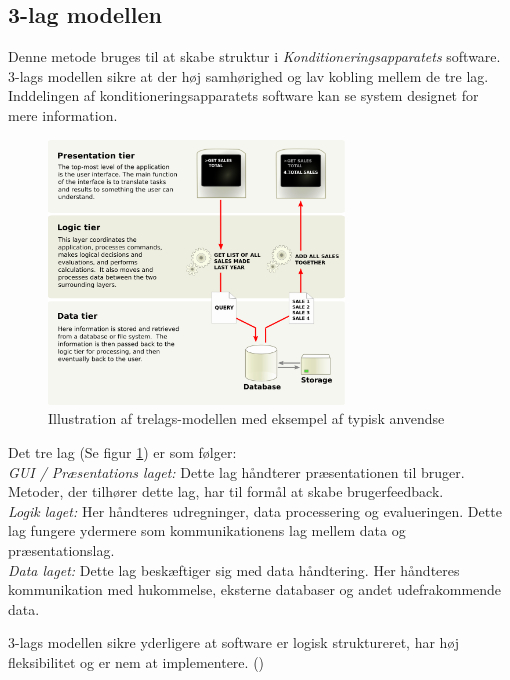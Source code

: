 \subsection{3-lag modellen}
Denne metode bruges til at skabe struktur i \textit{Konditioneringsapparatets} software. 3-lags modellen sikre at der høj samhørighed og lav kobling mellem de tre lag. Inddelingen af konditioneringsapparatets software kan se system designet  for mere information. 
\begin{figure}[H]
	\centering
\includegraphics[width = 0.7\textwidth]{billeder/trelagsmodel.png}
\caption{Illustration af trelags-modellen med eksempel af typisk anvendse}\label{fig:3lagsmodel}
\end{figure}
Det tre lag (Se figur \ref{fig:3lagsmodel}) er som følger: \\
\textit{GUI / Præsentations laget:} Dette lag håndterer præsentationen til bruger. Metoder, der tilhører dette lag, har til formål at skabe brugerfeedback. \\
\textit{Logik laget: } Her håndteres udregninger, data processering og evalueringen. Dette lag fungere ydermere som kommunikationens lag mellem data og præsentationslag. 
\\ \textit{Data laget: } Dette lag beskæftiger sig med data håndtering. Her håndteres kommunikation med hukommelse, eksterne databaser og andet udefrakommende data.

3-lags modellen sikre yderligere at software er logisk struktureret, har høj fleksibilitet og er nem at implementere. (\cite{RefWorks:31})
